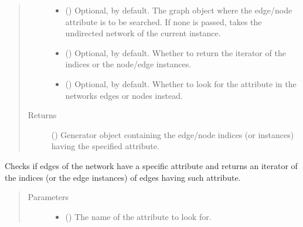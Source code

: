 \documentclass[letterpaper,10pt,english]{sphinxmanual}
\begin{document}
\begin{fulllineitems}
\begin{fulllineitems}
\begin{quote}
\begin{description}
\begin{itemize}
\item {} 
 () \textendash{} Optional,  by default. The graph object where the
edge/node attribute is to be searched. If none is passed,
takes the undirected network of the current instance.

\item {} 
 () \textendash{} Optional,  by default. Whether to return the
iterator of the indices or the node/edge instances.

\item {} 
 () \textendash{} Optional,  by default. Whether to look for the
attribute in the networks edges or nodes instead.

\end{itemize}

\item[{Returns}] \leavevmode
() \textendash{} Generator object containing the edge/node
indices (or instances) having the specified attribute.

\end{description}\end{quote}

\end{fulllineitems}


\begin{fulllineitems}
\label{\detokenize{reference:pypath.main.PyPath.having_eattr}}
Checks if edges of the network have a specific attribute and
returns an iterator of the indices (or the edge instances) of
edges having such attribute.
\begin{quote}\begin{description}
\item[{Parameters}] \leavevmode\begin{itemize}
\item {} 
 () \textendash{} The name of the attribute to look for.


\end{itemize}
\end{description}
\end{quote}
\end{fulllineitems}
\end{fulllineitems}
\end{document}
